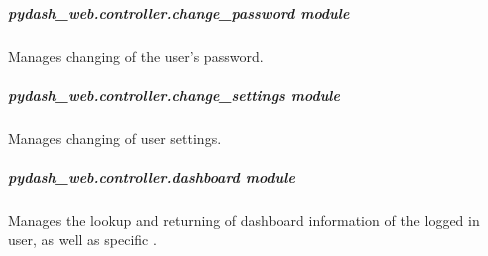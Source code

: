 \documentclass[letterpaper,10pt,english]{sphinxmanual}
\begin{document}
\begin{fulllineitems}
\label{\detokenize{pydash_web.controller.change_dashboard_settings:pydash_web.controller.change_dashboard_settings.change_dashboard_settings}}
\end{fulllineitems}



\subparagraph{pydash\_web.controller.change\_password module}
\label{\detokenize{pydash_web.controller.change_password:module-pydash_web.controller.change_password}}\label{\detokenize{pydash_web.controller.change_password:pydash-web-controller-change-password-module}}\label{\detokenize{pydash_web.controller.change_password::doc}}
Manages changing of the user’s password.

\begin{fulllineitems}
\label{\detokenize{pydash_web.controller.change_password:pydash_web.controller.change_password.change_password}}
\end{fulllineitems}



\subparagraph{pydash\_web.controller.change\_settings module}
\label{\detokenize{pydash_web.controller.change_settings:module-pydash_web.controller.change_settings}}\label{\detokenize{pydash_web.controller.change_settings:pydash-web-controller-change-settings-module}}\label{\detokenize{pydash_web.controller.change_settings::doc}}
Manages changing of user settings.

\begin{fulllineitems}
\label{\detokenize{pydash_web.controller.change_settings:pydash_web.controller.change_settings.change_settings}}
\end{fulllineitems}



\subparagraph{pydash\_web.controller.dashboard module}
\label{\detokenize{pydash_web.controller.dashboard:module-pydash_web.controller.dashboard}}\label{\detokenize{pydash_web.controller.dashboard:pydash-web-controller-dashboard-module}}\label{\detokenize{pydash_web.controller.dashboard::doc}}
Manages the lookup and returning of dashboard information of the logged in user, as well as specific .
\end{document}
